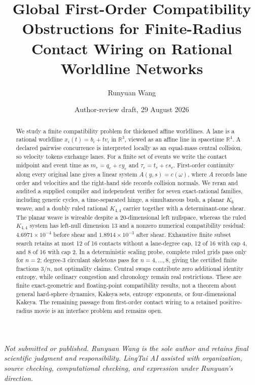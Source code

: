 \documentclass[11pt]{article}
\title{Global First-Order Compatibility Obstructions for Finite-Radius Contact Wiring on Rational Worldline Networks}
\author{Runyuan Wang}
\date{Author-review draft, 29 August 2026}
\theoremstyle{definition}
\theoremstyle{remark}
\newcommand{\R}{\mathbb R}
\newcommand{\eps}{\varepsilon}
\begin{document}
\maketitle

\begin{center}
\small\emph{Not submitted or published. Runyuan Wang is the sole author and retains final scientific judgment and responsibility. LingTai AI assisted with organization, source checking, computational checking, and expression under Runyuan's direction.}
\end{center}

\begin{abstract}
We study a finite compatibility problem for thickened affine worldlines. A lane is a rational worldline $x_i(t)=b_i+t v_i$ in $\R^3$, viewed as an affine line in spacetime $\R^4$. A declared pairwise concurrence is interpreted locally as an equal-mass central collision, so velocity tokens exchange lanes. For a finite set of events we write the contact midpoint and event time as $m_e=q_e+\eps y_e$ and $\tau_e=t_e+\eps s_e$. First-order continuity along every original lane gives a linear system $A(y,s)=c(\omega)$, where $A$ records lane order and velocities and the right-hand side records collision normals. We reran and audited a supplied compiler and independent verifier for seven exact-rational families, including generic cycles, a time-separated hinge, a simultaneous bush, a planar $K_6$ weave, and a doubly ruled rational $K_{4,4}$ carrier together with a determinant-one shear. The planar weave is wireable despite a 20-dimensional left nullspace, whereas the ruled $K_{4,4}$ system has left-null dimension 13 and a nonzero numerical compatibility residual: $4.6971\times10^{-4}$ before shear and $1.8914\times10^{-3}$ after shear. Exhaustive finite subset search retains at most 12 of 16 contacts without a lane-degree cap, 12 of 16 with cap 4, and 8 of 16 with cap 2. In a deterministic scaling probe, complete ruled grids pass only for $n=2$; degree-3 circulant skeletons pass for $n=4,\ldots,8$, giving the certified finite fractions $3/n$, not optimality claims. Central swaps contribute zero additional identity entropy, while ordinary congestion and chronology remain real restrictions. These are finite exact-geometric and floating-point compatibility results, not a theorem about general hard-sphere dynamics, Kakeya sets, entropy exponents, or four-dimensional Kakeya. The remaining passage from first-order contact wiring to a retained positive-radius movie is an interface problem and remains open.
\end{abstract}
\end{document}
